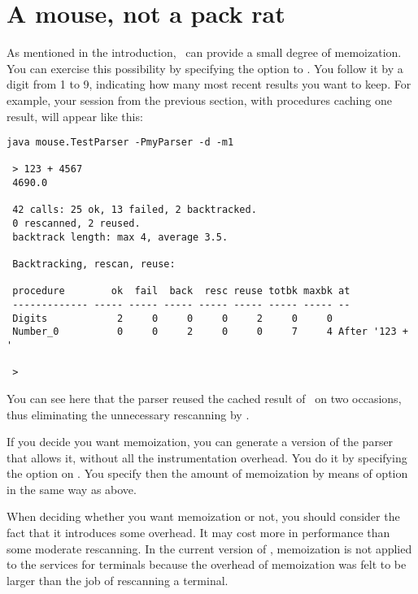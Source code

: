 \newpage

\section{A mouse, not a pack rat\label{packrat}}


As mentioned in the introduction, \Mouse\ can provide a small degree of memoization.
You can exercise this possibility by specifying the option  
to . 
You follow it by a digit from 1 to 9, indicating how many most recent results
you want to keep.
For example, your session from the previous section, with procedures
caching one result, will appear like this: 

\small
\begin{Verbatim}[samepage=true,xleftmargin=15mm,baselinestretch=0.8]
 java mouse.TestParser -PmyParser -d -m1

 > 123 + 4567   
 4690.0

 42 calls: 25 ok, 13 failed, 2 backtracked.
 0 rescanned, 2 reused.
 backtrack length: max 4, average 3.5.

 Backtracking, rescan, reuse:

 procedure        ok  fail  back  resc reuse totbk maxbk at             
 ------------- ----- ----- ----- ----- ----- ----- ----- --             
 Digits            2     0     0     0     2     0     0
 Number_0          0     0     2     0     0     7     4 After '123 + ' 

 >
\end{Verbatim}

\normalsize
You can see here that the parser reused the cached result
of \Digits\ on two occasions, thus eliminating the unnecessary rescanning by \tx{[0-9]}.

\medskip
If you decide you want memoization, you can generate a version of the parser
that allows it, without all the instrumentation overhead.
You do it by specifying the option  on .
You specify then the amount of memoization by means of  option
in the same way as above.

When deciding whether you want memoization or not, you should consider 
the fact that it introduces some overhead.
It may cost more in performance than some moderate rescanning.
In the current version of \Mouse,
memoization is not applied 
to the services for terminals 
because the overhead of memoization was felt to be larger
than the job of rescanning a terminal.
